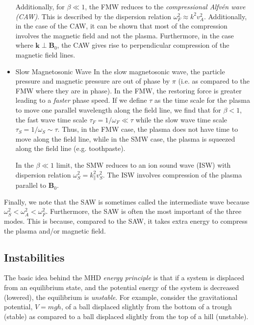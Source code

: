 \begin{itemize}
		Additionally, for $\beta\ll1$, the FMW reduces to the \textit{compressional Alfv\'en wave (CAW)}. This is described by the dispersion relation $\omega_F^2\approx k^2v_A^2$. Additionally, in the case of the CAW, it can be shown that most of the compression involves the magnetic field and not the plasma. Furthermore, in the case where $\mathbf{k}\perp\mathbf{B}_0$, the CAW gives rise to perpendicular compression of the magnetic field lines.

		\item{Slow Magnetosonic Wave}
		In the slow magnetosonic wave, the particle pressure and magnetic pressure are out of phase by $\pi$ (i.e. as compared to the FMW where they are in phase). In the FMW, the restoring force is greater leading to a \textit{faster} phase speed. If we define $\tau$ as the time scale for the plasma to move one parallel wavelength along the field line, we find that for $\beta<1$, the fast wave time scale $\tau_F=1/\omega_F\ll\tau$ while the slow wave time scale $\tau_S=1/\omega_S\sim\tau$. Thus, in the FMW case, the plasma does not have time to move along the field line, while in the SMW case, the plasma is squeezed along the field line (e.g. toothpaste).

		In the $\beta\ll1$ limit, the SMW reduces to an ion sound wave (ISW) with dispersion relation $\omega_S^2=k_{\parallel}^2v_S^2$. The ISW involves compression of the plasma parallel to $\mathbf{B}_0$.

	\end{itemize}

	Finally, we note that the SAW is sometimes called the intermediate wave because $\omega_S^2<\omega_A^2<\omega_F^2$. Furthermore, the SAW is often the most important of the three modes. This is because, compared to the SAW, it takes extra energy to compress the plasma and/or magnetic field.

	\subsection{Instabilities}
	The basic idea behind the MHD \textit{energy principle} is that if a system is displaced from an equilibrium state, and the potential energy of the system is decreased (lowered), the equilibrium is \textit{unstable}. For example, consider the gravitational potential, $V=mgh$, of a ball displaced slightly from the bottom of a trough (stable) as compared to a ball displaced slightly from the top of a hill (unstable).

